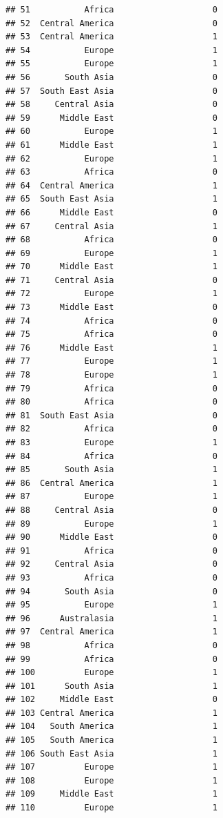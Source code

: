 \documentclass[]{article}
\begin{document}
\begin{verbatim}
## 51           Africa                    0
## 52  Central America                    0
## 53  Central America                    1
## 54           Europe                    1
## 55           Europe                    1
## 56       South Asia                    0
## 57  South East Asia                    0
## 58     Central Asia                    0
## 59      Middle East                    0
## 60           Europe                    1
## 61      Middle East                    1
## 62           Europe                    1
## 63           Africa                    0
## 64  Central America                    1
## 65  South East Asia                    1
## 66      Middle East                    0
## 67     Central Asia                    1
## 68           Africa                    0
## 69           Europe                    1
## 70      Middle East                    1
## 71     Central Asia                    0
## 72           Europe                    1
## 73      Middle East                    0
## 74           Africa                    0
## 75           Africa                    0
## 76      Middle East                    1
## 77           Europe                    1
## 78           Europe                    1
## 79           Africa                    0
## 80           Africa                    0
## 81  South East Asia                    0
## 82           Africa                    0
## 83           Europe                    1
## 84           Africa                    0
## 85       South Asia                    1
## 86  Central America                    1
## 87           Europe                    1
## 88     Central Asia                    0
## 89           Europe                    1
## 90      Middle East                    0
## 91           Africa                    0
## 92     Central Asia                    0
## 93           Africa                    0
## 94       South Asia                    0
## 95           Europe                    1
## 96      Australasia                    1
## 97  Central America                    1
## 98           Africa                    0
## 99           Africa                    0
## 100          Europe                    1
## 101      South Asia                    1
## 102     Middle East                    0
## 103 Central America                    1
## 104   South America                    1
## 105   South America                    1
## 106 South East Asia                    1
## 107          Europe                    1
## 108          Europe                    1
## 109     Middle East                    1
## 110          Europe                    1

\end{verbatim}
\end{document}

